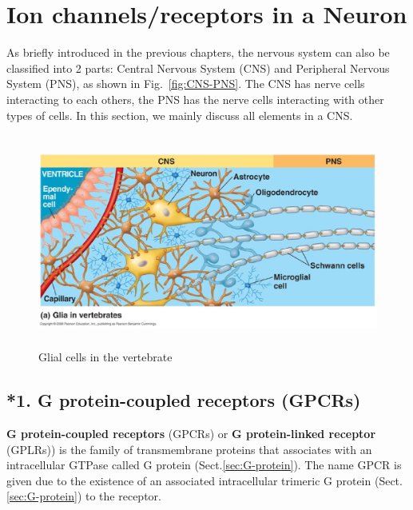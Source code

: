 \chapter{Ion channels/receptors in a Neuron}
\label{chap:neuron-receptors}

\def\Zn{{\text{Zn}^2+}}

As briefly introduced in the previous chapters, the nervous system can also be
classified into 2 parts: Central Nervous System (CNS) and Peripheral Nervous
System (PNS), as shown in Fig.~\ref{fig:CNS-PNS}. The CNS has nerve cells
interacting to each others, the PNS has the nerve cells interacting with other
types of cells. In this section, we mainly discuss all elements in a CNS.

\begin{figure}[h]
\centerline{\includegraphics[height=7cm]{./images/glial_cell.eps}}
\caption{Glial cells in the vertebrate}\label{fig:glial_cell}
\end{figure} 


\section{*1. G protein-coupled receptors (GPCRs)}
\label{sec:G-protein-coupled-receptor}
\label{sec:GPCR}

{\bf G protein-coupled receptors} (GPCRs) or {\bf G protein-linked receptor}
(GPLRs))  is the family of transmembrane proteins that associates with an
intracellular GTPase called G protein (Sect.\ref{sec:G-protein}).
The name GPCR is given due to the existence of an associated intracellular
trimeric G protein (Sect.\ref{sec:G-protein}) to the receptor.
  
